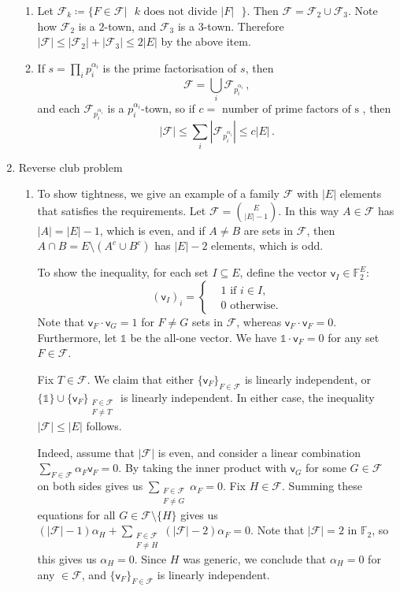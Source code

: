 \documentclass[kulak]{tplt}
\theoremstyle{definition}
\newcommand{\F}{\mathbb{F}}
\newcommand{\FF}{\mathcal F}
\newcommand{\vv}{\mathsf{v}}
\begin{document}
\begin{enumerate}
\begin{enumerate}
\item 
Let $\FF_k \coloneqq \{F \in \FF | \text{ $k$ does not divide $|F|$ } \}$.
Then $\FF = \FF_2 \cup \FF_3$.
Note how $\FF_2$ is a $2$-town, and $\FF_3$ is a $3$-town.
Therefore $|\FF| \leq |\FF_2| + |\FF_3| \leq 2|E|$ by the above item.


\item
If $s = \prod_i p_i^{\alpha_i}$ is the prime factorisation of $s$, then 
$$ \FF = \bigcup_i \FF_{p_i^{\alpha_i}}\, , $$
and each $\FF_{p_i^{\alpha_i}}$ is a $p_i^{\alpha_i}$-town, so if $c = \text{ number of prime factors of s }$, then
$$|\FF | \leq \sum_i |\FF_{p_i^{\alpha_i}}| \leq c |E| \, . $$
\end{enumerate}

\vspace{.8cm}

\item Reverse club problem

\begin{enumerate}
\item 
To show tightness, we give an example of a family $\FF$ with $|E|$ elements that satisfies the requirements.
Let $\FF = \binom{E}{|E| - 1}$.
In this way $A \in \FF $ has $|A| = |E| - 1$, which is even, and if $A\neq B $ are sets in $\FF$, then $A\cap B = E\setminus (A^c \cup B^c) $ has $|E| - 2$ elements, which is odd.

To show the inequality, for each set $I \subseteq E$, define the vector $\vv_I \in \F_2^E$:
$$ (\vv_I)_i =\begin{cases*}
      & 1 \text{ if $i \in I$,}\\
      & 0 \text{ otherwise.}
    \end{cases*} $$
Note that $\vv_F \cdot \vv_G = 1$ for $F\neq G$ sets in $\FF$, whereas $\vv_F \cdot \vv_F = 0$.
Furthermore, let $\mathbb{1} $ be the all-one vector.
We have $\mathbb{1} \cdot \vv_F = 0$ for any set $F \in \FF$.


Fix $T \in \FF$.
We claim that either $\{\vv_F\}_{F \in \FF}$ is linearly independent, or $\{\mathbb{1}\} \cup \{\vv_F\}_{\substack{F \in \FF \\ F \neq T}}$ is linearly independent.
In either case, the inequality $|\FF| \leq |E|$ follows.

Indeed, assume that $|\FF|$ is even, and consider a linear combination $\sum_{F\in \FF} \alpha_F \vv_F = 0$.
By taking the inner product with $\vv_G$ for some $G\in \FF$ on both sides gives us $\sum_{\substack{F\in \FF\\ F \neq G}} \alpha_F = 0$.
Fix $H \in \FF$.
Summing these equations for all $G \in\FF \setminus \{H \}$ gives us $(|\FF| - 1 ) \alpha_H +  \sum_{\substack{F \in \FF \\ F \neq H}} (|\FF| - 2 ) \alpha_F = 0$.
Note that $|\FF| = 2 $ in $\F_2$, so this gives us $\alpha_H  = 0$.
Since $H$ was generic, we conclude that $\alpha_H =0 $ for any $\in \FF$, and $\{\vv_F\}_{F \in \FF}$ is linearly independent.


\end{enumerate}
\end{enumerate}
\end{document}
